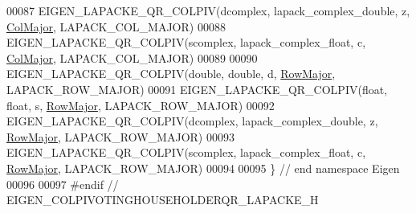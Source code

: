 \begin{DoxyCode}
00087 EIGEN\_LAPACKE\_QR\_COLPIV(dcomplex, lapack\_complex\_double, z, \hyperlink{group__enums_ggaacded1a18ae58b0f554751f6cdf9eb13a0cbd4bdd0abcfc0224c5fcb5e4f6669a}{ColMajor}, LAPACK\_COL\_MAJOR)
00088 EIGEN\_LAPACKE\_QR\_COLPIV(scomplex, lapack\_complex\_float,  c, \hyperlink{group__enums_ggaacded1a18ae58b0f554751f6cdf9eb13a0cbd4bdd0abcfc0224c5fcb5e4f6669a}{ColMajor}, LAPACK\_COL\_MAJOR)
00089 
00090 EIGEN\_LAPACKE\_QR\_COLPIV(\textcolor{keywordtype}{double},   \textcolor{keywordtype}{double},        d, \hyperlink{group__enums_ggaacded1a18ae58b0f554751f6cdf9eb13acfcde9cd8677c5f7caf6bd603666aae3}{RowMajor}, LAPACK\_ROW\_MAJOR)
00091 EIGEN\_LAPACKE\_QR\_COLPIV(\textcolor{keywordtype}{float},    \textcolor{keywordtype}{float},         s, \hyperlink{group__enums_ggaacded1a18ae58b0f554751f6cdf9eb13acfcde9cd8677c5f7caf6bd603666aae3}{RowMajor}, LAPACK\_ROW\_MAJOR)
00092 EIGEN\_LAPACKE\_QR\_COLPIV(dcomplex, lapack\_complex\_double, z, \hyperlink{group__enums_ggaacded1a18ae58b0f554751f6cdf9eb13acfcde9cd8677c5f7caf6bd603666aae3}{RowMajor}, LAPACK\_ROW\_MAJOR)
00093 EIGEN\_LAPACKE\_QR\_COLPIV(scomplex, lapack\_complex\_float,  c, \hyperlink{group__enums_ggaacded1a18ae58b0f554751f6cdf9eb13acfcde9cd8677c5f7caf6bd603666aae3}{RowMajor}, LAPACK\_ROW\_MAJOR)
00094 
00095 \} \textcolor{comment}{// end namespace Eigen}
00096 
00097 \textcolor{preprocessor}{#endif // EIGEN\_COLPIVOTINGHOUSEHOLDERQR\_LAPACKE\_H}
\end{DoxyCode}
